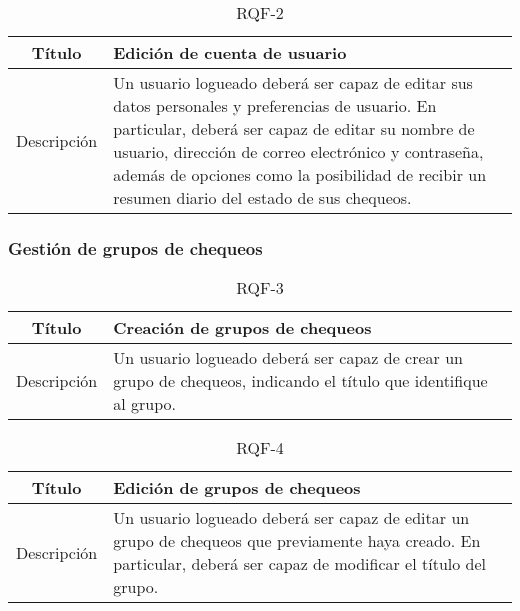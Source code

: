 \begin{table}[h!]
  \centering
  \begin{tabularx}{\textwidth}{|c|X|}
    \hline
    Título & Edición de cuenta de usuario \\

    \hline

    Descripción & Un usuario logueado deberá ser capaz de editar sus datos
    personales y preferencias de usuario. En particular, deberá ser capaz de
    editar su nombre de usuario, dirección de correo electrónico y contraseña,
    además de opciones como la posibilidad de recibir un resumen diario del
    estado de sus chequeos.\\

    \hline
  \end{tabularx}
  \caption{RQF-2}
\end{table}

\FloatBarrier
\subsubsection{Gestión de grupos de chequeos}

\begin{table}[h!]
  \centering
  \begin{tabularx}{\textwidth}{|c|X|}
    \hline
    Título & Creación de grupos de chequeos \\

    \hline

    Descripción & Un usuario logueado deberá ser capaz de crear un grupo de
    chequeos, indicando el título que identifique al grupo.\\

    \hline
  \end{tabularx}
  \caption{RQF-3}
\end{table}

\begin{table}[h!]
  \centering
  \begin{tabularx}{\textwidth}{|c|X|}
    \hline
    Título & Edición de grupos de chequeos \\

    \hline

    Descripción & Un usuario logueado deberá ser capaz de editar un grupo de
    chequeos que previamente haya creado. En particular, deberá ser capaz de
    modificar el título del grupo.

    \\

    \hline
  \end{tabularx}
  \caption{RQF-4}
\end{table}


